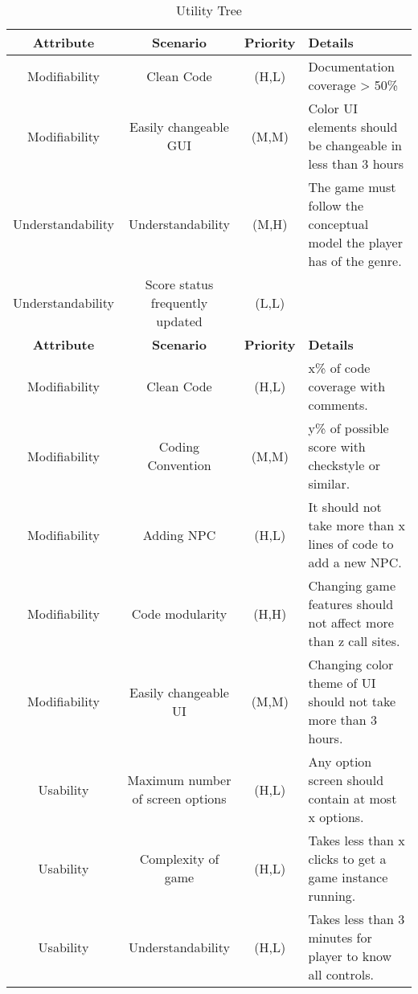 \begin{table}[H]
	\begin{center}
		\begin{tabular}{| c | c | c | p{3cm}|}
    		\hline

			\textbf{Attribute}		&	\textbf{Scenario} 				&   \textbf{Priority} 	& \textbf{Details} 			\\															
			\hline
			Modifiability			& 	Clean Code						& 	(H,L)		& Documentation coverage > 50\%\\
			Modifiability			&	Easily changeable GUI			& 	(M,M)		& Color UI elements should be changeable in less than 3 hours \\
			Understandability		& 	Understandability				& 	(M,H)		& The game must follow the conceptual model the player has of the genre. \\
			Understandability 		& 	Score status frequently updated	& 	(L,L)		& \\

		        \textbf{Attribute}		&	\textbf{Scenario} 	&   \textbf{Priority} 	& \textbf{Details} 			\\															
			\hline
			Modifiability			& 	Clean Code		& 	(H,L)			& x\% of code coverage with comments. 	\\
			Modifiability			&	Coding Convention	& 	(M,M)			& y\% of possible score with checkstyle or similar. \\
                        Modifiability & Adding NPC & (H,L) & It should not take more than x lines of code to add a new NPC. \\
                        Modifiability & Code modularity & (H,H) & Changing game features should not affect more than z call sites. \\
                        Modifiability & Easily changeable UI & (M,M) & Changing color theme of UI should not take more than 3 hours. \\
                        Usability & Maximum number of screen options & (H,L) & Any option screen should contain at most x options. \\
                        Usability & Complexity of game & (H,L) & Takes less than x clicks to get a game instance running. \\
                        Usability & Understandability & (H,L) & Takes less than 3 minutes for player to know all controls. \\
			\hline
    	\end{tabular}
	\end{center}
	\label{tab:Utility_tree}
	\caption{Utility Tree}
\end{table}

